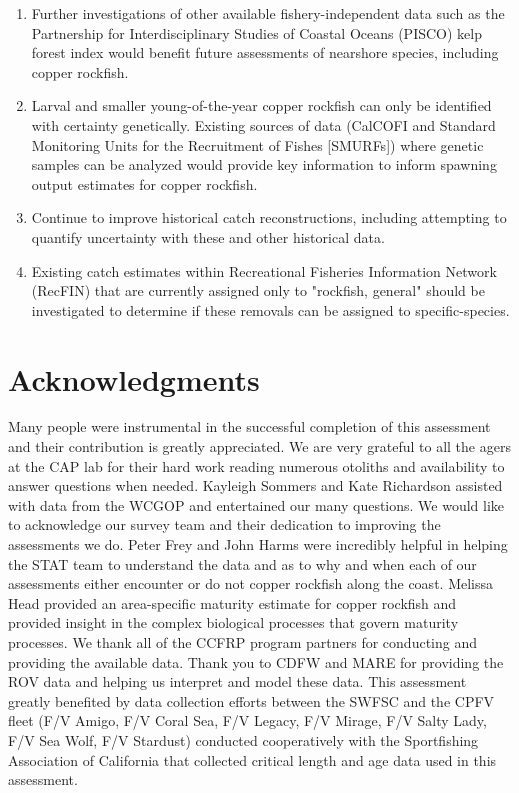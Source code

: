 \documentclass[11pt,
  english,
  letterpaper,
]{article}
\begin{document}
\begin{enumerate}
 \item Further investigations of other available fishery-independent data such as the Partnership for Interdisciplinary Studies of Coastal Oceans (PISCO) kelp forest index would benefit future assessments of nearshore species, including copper rockfish. 

 \item Larval and smaller young-of-the-year copper rockfish can only be identified with certainty genetically. Existing sources of data (CalCOFI and Standard Monitoring Units for the Recruitment of Fishes [SMURFs]) where genetic samples can be analyzed would provide key information to inform spawning output estimates for copper rockfish.
 
  \item Continue to improve historical catch reconstructions, including attempting to quantify uncertainty with these and other historical data.
  
  \item Existing catch estimates within Recreational Fisheries Information Network (RecFIN) that are currently assigned only to "rockfish, general" should be investigated to determine if these removals can be assigned to specific-species.



\end{enumerate}

\hypertarget{acknowledgments}{%
\section{Acknowledgments}\label{acknowledgments}}

Many people were instrumental in the successful completion of this assessment and their contribution is greatly appreciated. We are very grateful to all the agers at the CAP lab for their hard work reading numerous otoliths and availability to answer questions when needed. Kayleigh Sommers and Kate Richardson assisted with data from the WCGOP and entertained our many questions. We would like to acknowledge our survey team and their dedication to improving the assessments we do. Peter Frey and John Harms were incredibly helpful in helping the STAT team to understand the data and as to why and when each of our assessments either encounter or do not copper rockfish along the coast. Melissa Head provided an area-specific maturity estimate for copper rockfish and provided insight in the complex biological processes that govern maturity processes. We thank all of the CCFRP program partners for conducting and providing the available data. Thank you to CDFW and MARE for providing the ROV data and helping us interpret and model these data. This assessment greatly benefited by data collection efforts between the SWFSC and the CPFV fleet (F/V Amigo, F/V Coral Sea, F/V Legacy, F/V Mirage, F/V Salty Lady, F/V Sea Wolf, F/V Stardust) conducted cooperatively with the Sportfishing Association of California that collected critical length and age data used in this assessment.
\end{document}
